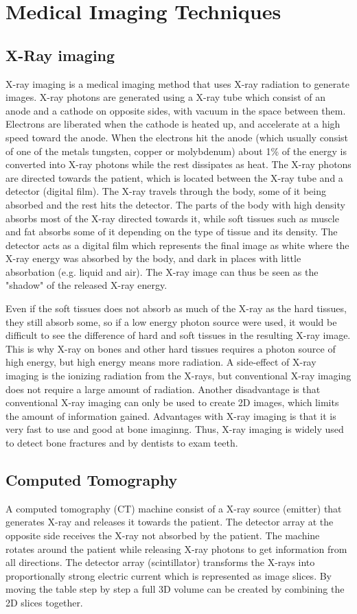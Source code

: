 \section{Medical Imaging Techniques}

\subsection{X-Ray imaging}
X-ray imaging is a medical imaging method that uses X-ray radiation to generate images. X-ray photons are generated using a X-ray tube which consist of an anode and a cathode on opposite sides, with vacuum in the space between them. Electrons are liberated when the cathode is heated up, and accelerate at a high speed toward the anode. When the electrons hit the anode (which usually consist of one of the metals tungsten, copper or molybdenum) about 1\% of the energy is converted into X-ray photons while the rest dissipates as heat. The X-ray photons are directed towards the patient, which is located between the X-ray tube and a detector (digital film). The X-ray travels through the body, some of it being absorbed and the rest hits the detector. The parts of the body with high density absorbs most of the X-ray directed towards it, while soft tissues such as muscle and fat absorbs some of it depending on the type of tissue and its density. The detector acts as a digital film which represents the final image as white where the X-ray energy was absorbed by the body, and dark in places with little absorbation (e.g. liquid and air). The X-ray image can thus be seen as the "shadow" of the released X-ray energy. 

Even if the soft tissues does not absorb as much of the X-ray as the hard tissues, they still absorb some, so if a low energy photon source were used, it would be difficult to see the difference of hard and soft tissues in the resulting X-ray image. This is why X-ray on bones and other hard tissues requires a photon source of high energy, but high energy means more radiation. A side-effect of X-ray imaging is the ionizing radiation from the X-rays, but conventional X-ray imaging does not require a large amount of radiation. Another disadvantage is that conventional X-ray imaging can only be used to create 2D images, which limits the amount of information gained. Advantages with X-ray imaging is that it is very fast to use and good at bone imaginng. Thus, X-ray imaging is widely used to detect bone fractures and by dentists to exam teeth.

\subsection{Computed Tomography}
A computed tomography (CT) machine consist of a X-ray source (emitter) that generates X-ray and releases it towards the patient. The detector array at the opposite side receives the X-ray not absorbed by the patient. The machine rotates around the patient while releasing X-ray photons to get information from all directions. The detector array (scintillator) transforms the X-rays into proportionally strong electric current which is represented as image slices. By moving the table step by step a full 3D volume can be created by combining the 2D slices together. 

